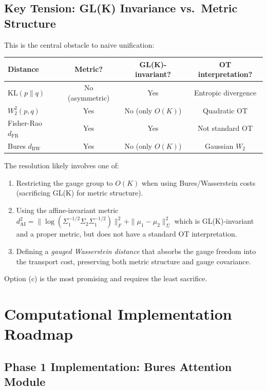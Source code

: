 \documentclass[11pt]{article}
\newcommand{\KL}{\mathrm{KL}}
\begin{document}
\subsection{Key Tension: GL(K) Invariance vs.\ Metric Structure}

This is the central obstacle to naive unification:

\begin{center}
\begin{tabular}{lccc}
\toprule
\textbf{Distance} & \textbf{Metric?} & \textbf{GL(K)-invariant?} & \textbf{OT interpretation?} \\
\midrule
$\KL(p\|q)$ & No (asymmetric) & Yes & Entropic divergence \\
$W_2^2(p,q)$ & Yes & No (only $O(K)$) & Quadratic OT \\
Fisher-Rao $d_{\text{FR}}$ & Yes & Yes & Not standard OT \\
Bures $d_{\text{BW}}$ & Yes & No (only $O(K)$) & Gaussian $W_2$ \\
\bottomrule
\end{tabular}
\end{center}

The resolution likely involves one of:
\begin{enumerate}
    \item[(a)] Restricting the gauge group to $O(K)$ when using Bures/Wasserstein costs (sacrificing GL(K) for metric structure).
    \item[(b)] Using the affine-invariant metric $d_{\text{AI}}^2 = \|\log(\Sigma_1^{-1/2}\Sigma_2\Sigma_1^{-1/2})\|_F^2 + \|\mu_1 - \mu_2\|_{\Sigma}^2$ which is GL(K)-invariant and a proper metric, but does not have a standard OT interpretation.
    \item[(c)] Defining a \emph{gauged Wasserstein distance} that absorbs the gauge freedom into the transport cost, preserving both metric structure and gauge covariance.
\end{enumerate}

Option (c) is the most promising and requires the least sacrifice.


\section{Computational Implementation Roadmap}

\subsection{Phase 1 Implementation: Bures Attention Module}
\end{document}
